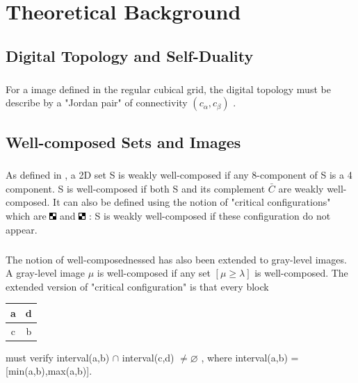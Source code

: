 \documentclass[12pt,a4paper]{report}
\author{HUYNH Le Duy}
\begin{document}
\tableofcontents

\chapter{Theoretical Background}
\section{Digital Topology and Self-Duality}
\paragraph{}
For a image defined in the regular cubical grid, the digital topology must be describe by a "Jordan pair" of connectivity $(c_\alpha,c_\beta)$ \cite{Kong:1989:DTI:71397.71400}.

\section{Well-composed Sets and Images}
\paragraph{}
As defined in \cite{Latecki95}, a 2D set S is weakly well-composed if any 8-component of S is a 4 component. S is well-composed if both S and its complement $\bar{C}$ are weakly well-composed. It can also be defined using the notion of "critical configurations" which are \includegraphics{confi1.jpg} and \includegraphics{confi2.jpg} : S is weakly well-composed if these configuration do not appear.
\paragraph{}
The notion of well-composednessed has also been extended to gray-level images. A gray-level image $\mu$ is well-composed if any set $[\mu \geq \lambda ]$ is well-composed. The extended version of "critical configuration" is that every block \begin{tabular}{|c|c|}
\hline 
a & d \\ 
\hline 
c & b \\ 
\hline 
\end{tabular} 
must verify interval(a,b) $\cap$ interval(c,d) $\neq \varnothing$ , where interval(a,b) = [min(a,b),max(a,b)].
\end{document}
